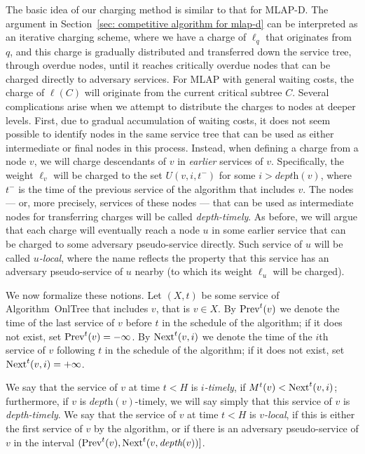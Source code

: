\documentclass[a4paper]{article}
\newcommand{\length}{\ell}
\newcommand{\depth}{\textit{depth}}
\newcommand{\OnAlgTreesGeneral}{{\sc OnlTree}}
\newcommand{\MLAP}{\mbox{\rm\textsf{MLAP}}}
\newcommand{\MLAPD}{\mbox{\rm\textsf{MLAP-D}}}
\newcommand{\vertmaturity}{M}
\newcommand{\prv}[2]{\mbox{\rm Prev}^#1(#2)}
\newcommand{\nxt}[3]{\mbox{\rm Next}^#1(#2,#3)}
\begin{document}
The basic idea of our charging method is similar to that for {\MLAPD}.
The argument in Section~\ref{sec: competitive algorithm for mlap-d}
can be interpreted as an iterative charging scheme, where we have a
charge of $\length_q$ that originates from $q$, and this charge is
gradually distributed and transferred down the service tree, through
overdue nodes, until it reaches critically overdue nodes that can be
charged directly to adversary services.  For {\MLAP} with general
waiting costs, the charge of $\length(C)$ will originate from the
current critical subtree $C$. Several complications arise when we attempt to
distribute the charges to nodes at deeper levels.
First,
due to gradual accumulation of waiting costs, it does not seem
possible to identify nodes in the same service tree that can be used
as either intermediate or final nodes in this process.  Instead, when
defining a charge from a node $v$, we will charge descendants of $v$ in 
\emph{earlier} services of
$v$. Specifically, the weight $\length_v$ will be charged to the set
$U(v,i,t^-)$ for some $i>\depth(v)$, where $t^-$ is the time of the previous
service of the algorithm that includes $v$.  The nodes --- or, more
precisely, services of these nodes --- that can be used as
intermediate nodes for transferring charges will be called
\emph{depth-timely}.  As before, we will argue that each charge will
eventually reach a node $u$ in some earlier service that can be
charged to some adversary pseudo-service directly.  Such service of
$u$ will be called \emph{$u$-local}, where the name reflects the property
that this service has an adversary pseudo-service of $u$ nearby (to
which its weight $\length_u$ will be charged).

\smallskip

We now formalize these notions.
Let $(X,t)$ be some service of Algorithm~{\OnAlgTreesGeneral} that includes $v$,
that is $v\in X$.
By $\prv{t}{v}$ we denote the time of the last service of $v$ before
$t$ in the schedule of the algorithm; if it does not exist, set
$\prv{t}{v}=-\infty$.
By $\nxt{t}{v}{i}$ we denote the time of the $i$th service of $v$
following $t$ in the schedule of the algorithm; if it does not exist,
set $\nxt{t}{v}{i}=+\infty$.

We say that the service of $v$ at time $t<H$ is \emph{$i$-timely}, if
$\vertmaturity^t(v)<\nxt{t}{v}{i}$; furthermore, if $v$ is
$\depth(v)$-timely, we will say simply that this service of $v$ is
\emph{depth-timely}.
We say that the service of $v$ at time $t<H$ is \emph{$v$-local}, if
this is either the first service of $v$ by the algorithm, or if
there is an adversary pseudo-service of $v$ in the interval
$(\prv{t}{v},\nxt{t}{v}{\depth(v)}]$.
\end{document}
